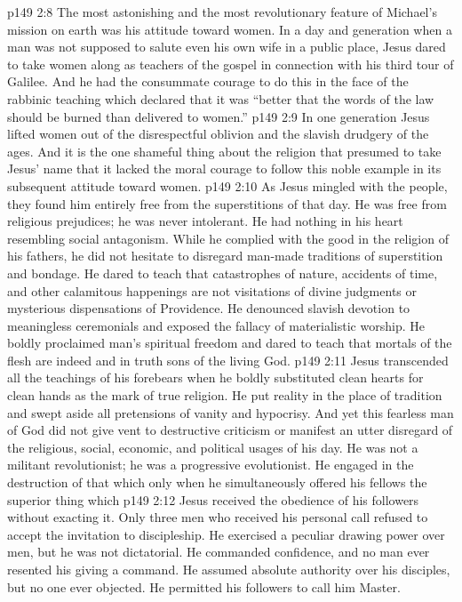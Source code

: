 \vs p149 2:8 \pc The most astonishing and the most revolutionary feature of Michael’s mission on earth was his attitude toward women. In a day and generation when a man was not supposed to salute even his own wife in a public place, Jesus dared to take women along as teachers of the gospel in connection with his third tour of Galilee. And he had the consummate courage to do this in the face of the rabbinic teaching which declared that it was “better that the words of the law should be burned than delivered to women.”
\vs p149 2:9 In one generation Jesus lifted women out of the disrespectful oblivion and the slavish drudgery of the ages. And it is the one shameful thing about the religion that presumed to take Jesus’ name that it lacked the moral courage to follow this noble example in its subsequent attitude toward women.
\vs p149 2:10 \pc As Jesus mingled with the people, they found him entirely free from the superstitions of that day. He was free from religious prejudices; he was never intolerant. He had nothing in his heart resembling social antagonism. While he complied with the good in the religion of his fathers, he did not hesitate to disregard man\hyp{}made traditions of superstition and bondage. He dared to teach that catastrophes of nature, accidents of time, and other calamitous happenings are not visitations of divine judgments or mysterious dispensations of Providence. He denounced slavish devotion to meaningless ceremonials and exposed the fallacy of materialistic worship. He boldly proclaimed man’s spiritual freedom and dared to teach that mortals of the flesh are indeed and in truth sons of the living God.
\vs p149 2:11 Jesus transcended all the teachings of his forebears when he boldly substituted clean hearts for clean hands as the mark of true religion. He put reality in the place of tradition and swept aside all pretensions of vanity and hypocrisy. And yet this fearless man of God did not give vent to destructive criticism or manifest an utter disregard of the religious, social, economic, and political usages of his day. He was not a militant revolutionist; he was a progressive evolutionist. He engaged in the destruction of that which  only when he simultaneously offered his fellows the superior thing which 
\vs p149 2:12 \pc Jesus received the obedience of his followers without exacting it. Only three men who received his personal call refused to accept the invitation to discipleship. He exercised a peculiar drawing power over men, but he was not dictatorial. He commanded confidence, and no man ever resented his giving a command. He assumed absolute authority over his disciples, but no one ever objected. He permitted his followers to call him Master.
